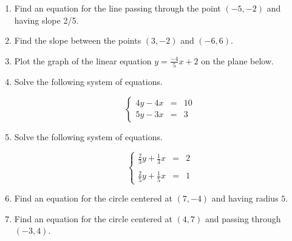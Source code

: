 \documentclass{article}
\begin{document}
\ActivityTitle[class={College Algebra}, number={1}, name={Lines and Circles}]

\begin{enumerate}
\item Find an equation for the line passing through the point $(-5, -2)$ and having slope 2/5. \vspace{5cm}

\item Find the slope between the points $(3, -2)$ and $(-6, 6)$. \vspace{5cm}

\item Plot the graph of the linear equation $y = \frac{-4}{5} x + 2$ on the plane below.\begin{center}
\CartesianPlane[h=7,w=7,axes=yes]
\end{center}

  

\newpage

\item Solve the following system of equations.

\[ \left\{ \begin{array}{rcl} 4y - 4x & = & 10 \\ 5y - 3x & = & 3 \end{array} \right. \] \vspace{5cm}

\item Solve the following system of equations.

\[ \left\{ \begin{array}{rcl} \frac{2}{3}y + \frac{1}{3}x & = & 2 \\ & & \\ \frac{2}{5}y + \frac{1}{5}x & = & 1 \end{array} \right. \] \vspace{5cm}

\item Find an equation for the circle centered at $(7, -4)$ and having radius $5$. \vspace{2cm}

\item Find an equation for the circle centered at $(4, 7)$ and passing through $(-3, 4)$. \vspace{5cm}
\end{enumerate}
\end{document}
